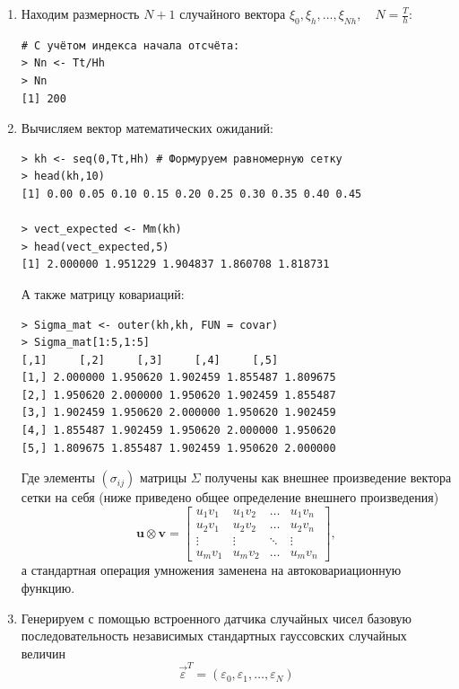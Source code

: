 \documentclass[14pt,a4paper]{scrartcl}
\begin{document}
\begin{enumerate}
	\item Находим размерность $N+1$ случайного вектора $\xi_0, \xi_h, \ldots, \xi_{Nh}, \quad N = \frac{T}{h}$:
\begin{verbatim}
# С учётом индекса начала отсчёта:
> Nn <- Tt/Hh
> Nn
[1] 200
\end{verbatim}

	\item Вычисляем вектор математических ожиданий:
\begin{verbatim}
> kh <- seq(0,Tt,Hh) # Формуруем равномерную сетку
> head(kh,10)
[1] 0.00 0.05 0.10 0.15 0.20 0.25 0.30 0.35 0.40 0.45

> vect_expected <- Mm(kh) 
> head(vect_expected,5)
[1] 2.000000 1.951229 1.904837 1.860708 1.818731
\end{verbatim}
	А также матрицу ковариаций:
\begin{verbatim}
> Sigma_mat <- outer(kh,kh, FUN = covar)
> Sigma_mat[1:5,1:5]
[,1]     [,2]     [,3]     [,4]     [,5]
[1,] 2.000000 1.950620 1.902459 1.855487 1.809675
[2,] 1.950620 2.000000 1.950620 1.902459 1.855487
[3,] 1.902459 1.950620 2.000000 1.950620 1.902459
[4,] 1.855487 1.902459 1.950620 2.000000 1.950620
[5,] 1.809675 1.855487 1.902459 1.950620 2.000000
\end{verbatim}
	Где элементы $( \sigma_{ij} )$ матрицы $\Sigma$ получены как внешнее произведение вектора сетки на себя (ниже приведено общее определение внешнего произведения)
\begin{equation*}
	\mathbf{u} \otimes \mathbf{v}=\left[\begin{array}{cccc}
	u_{1} v_{1} & u_{1} v_{2} & \dots & u_{1} v_{n} \\
	u_{2} v_{1} & u_{2} v_{2} & \dots & u_{2} v_{n} \\
	\vdots & \vdots & \ddots & \vdots \\
	u_{m} v_{1} & u_{m} v_{2} & \dots & u_{m} v_{n}
	\end{array}\right],
\end{equation*}
	а стандартная операция умножения заменена на автоковариационную функцию.
	\pagebreak
	\item Генерируем с помощью встроенного датчика случайных чисел базовую последовательность независимых стандартных гауссовских случайных величин
	\begin{equation*}
	\overrightarrow{\varepsilon}^T = (\varepsilon_0, \varepsilon_1, \ldots, \varepsilon_N)
	\end{equation*}
	

\end{enumerate}
\end{document}
